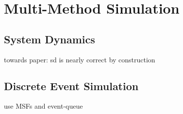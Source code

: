 \section{Multi-Method Simulation}

\subsection{System Dynamics}
towards paper: sd is nearly correct by construction

\subsection{Discrete Event Simulation}
use MSFs and event-queue